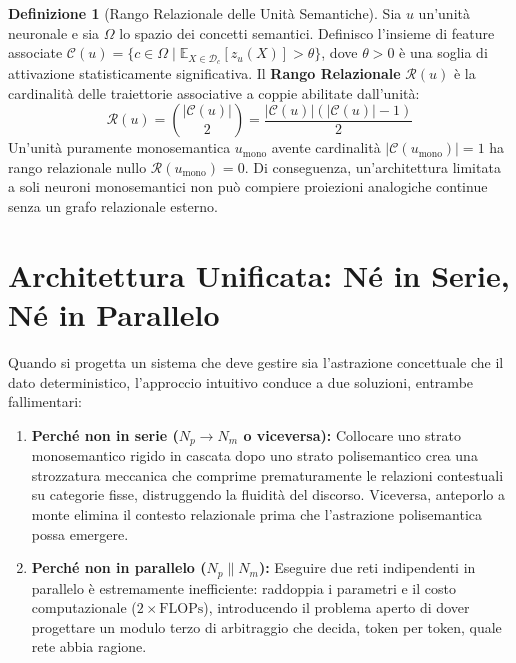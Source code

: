 \documentclass[11pt,a4paper]{article}
\theoremstyle{definition}
\newtheorem{definizione}{Definizione}
\begin{document}
\begin{definizione}[Rango Relazionale delle Unità Semantiche]
Sia $u$ un'unità neuronale e sia $\Omega$ lo spazio dei concetti semantici. Definisco l'insieme di feature associate $\mathcal{C}(u) = \{c \in \Omega \mid \mathbb{E}_{X \in \mathcal{D}_c}[z_u(X)] > \theta\}$, dove $\theta > 0$ è una soglia di attivazione statisticamente significativa. Il \textbf{Rango Relazionale} $\mathcal{R}(u)$ è la cardinalità delle traiettorie associative a coppie abilitate dall'unità:
\begin{equation}
    \mathcal{R}(u) = \binom{|\mathcal{C}(u)|}{2} = \frac{|\mathcal{C}(u)| (|\mathcal{C}(u)| - 1)}{2}
\end{equation}
Un'unità puramente monosemantica $u_{\mathrm{mono}}$ avente cardinalità $|\mathcal{C}(u_{\mathrm{mono}})| = 1$ ha rango relazionale nullo $\mathcal{R}(u_{\mathrm{mono}}) = 0$. Di conseguenza, un'architettura limitata a soli neuroni monosemantici non può compiere proiezioni analogiche continue senza un grafo relazionale esterno.
\end{definizione}

\section{Architettura Unificata: Né in Serie, Né in Parallelo}

Quando si progetta un sistema che deve gestire sia l'astrazione concettuale che il dato deterministico, l'approccio intuitivo conduce a due soluzioni, entrambe fallimentari:

\begin{enumerate}[leftmargin=*, itemsep=2.5pt]
    \item \textbf{Perché non in serie ($N_p \to N_m$ o viceversa):} Collocare uno strato monosemantico rigido in cascata dopo uno strato polisemantico crea una strozzatura meccanica che comprime prematuramente le relazioni contestuali su categorie fisse, distruggendo la fluidità del discorso. Viceversa, anteporlo a monte elimina il contesto relazionale prima che l'astrazione polisemantica possa emergere.
    \item \textbf{Perché non in parallelo ($N_p \parallel N_m$):} Eseguire due reti indipendenti in parallelo è estremamente inefficiente: raddoppia i parametri e il costo computazionale ($2\times \mathrm{FLOPs}$), introducendo il problema aperto di dover progettare un modulo terzo di arbitraggio che decida, token per token, quale rete abbia ragione.
\end{enumerate}
\end{document}
